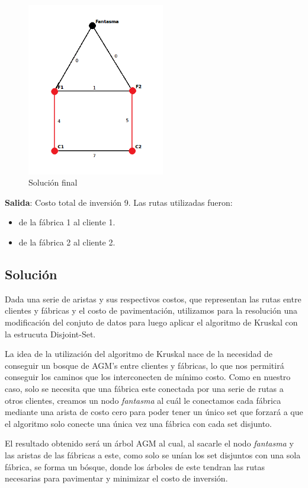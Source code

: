\documentclass[a4paper, 10pt, twoside]{article}
\begin{document}
\begin{figure}[ht!]
\centering
\includegraphics[width=60mm]{../ejemplo_graficos/CosoDosSubconjuntosSolucionSinFantasma.png}
\caption{Solución final}
\label{5}
\end{figure} 

\textbf{Salida}: Costo total de inversión 9. Las rutas utilizadas fueron:
\begin{itemize}
\item{de la fábrica 1 al cliente 1.}
\item{de la fábrica 2 al cliente 2.}
\end{itemize}

\subsection{Solución}

Dada una serie de aristas y sus respectivos costos, que representan las rutas entre clientes y fábricas y el costo de pavimentación, utilizamos para la resolución una modificación del conjuto de datos para luego aplicar el algoritmo de Kruskal con la estrucuta Disjoint-Set.

La idea de la utilización del algoritmo de Kruskal nace de la necesidad de conseguir un bosque de AGM's entre clientes y fábricas, lo que nos permitirá conseguir los caminos que los interconecten de mínimo costo. Como en nuestro caso, solo se necesita que una fábrica este conectada por una serie de rutas a otros clientes, creamos un nodo \textit{fantasma} al cuál le conectamos cada fábrica mediante una arista de costo cero para poder tener un único set que forzará a que el algoritmo solo conecte una única vez una fábrica con cada set disjunto.

El resultado obtenido será un árbol AGM al cual, al sacarle el nodo \textit{fantasma} y las aristas de las fábricas a este, como solo se unían los set disjuntos con una sola fábrica, se forma un bósque, donde los árboles de este tendran las rutas necesarias para pavimentar y minimizar el costo de inversión.
\end{document}
